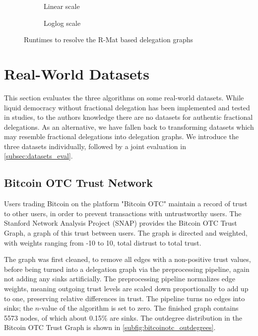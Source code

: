 \begin{figure}[t]
    \centering
    \begin{subfigure}[t]{0.45\textwidth}
        \centering
        \caption{Linear scale}
        \label{subfig:rmat_linear}
    \end{subfigure}
    \hfill
    \begin{subfigure}[t]{0.45\textwidth}
        \centering
        \caption{Loglog scale}
        \label{subfig:rmat_loglog}
    \end{subfigure}
    \caption{Runtimes to resolve the R-Mat based delegation graphs}
    \label{fig:rmat}
\end{figure}


\section{Real-World Datasets}

This section evaluates the three algorithms on some real-world datasets. While liquid democracy without fractional delegation has been implemented and tested in studies, to the authors knowledge there are no datasets for authentic fractional delegations. As an alternative, we have fallen back to transforming datasets which may resemble fractional delegations into delegation graphs. We  introduce the three datasets individually, followed by a joint evaluation in \cref{subsec:datasets_eval}.

\subsection{Bitcoin OTC Trust Network}

Users trading Bitcoin on the platform "Bitcoin OTC" maintain a record of trust to other users, in order to prevent transactions with untrustworthy users. The Stanford Network Analysis Project (SNAP) provides the Bitcoin OTC Trust Graph, a graph of this trust between users. \cite{kumar2016edge, kumar2018rev2} The graph is directed and weighted, with weights ranging from -10 to 10, total distrust to total trust. 

The graph was first cleaned, to remove all edges with a non-positive trust values, before being turned into a delegation graph via the preprocessing pipeline, again not adding any sinks artificially. The preprocessing pipeline normalizes edge weights, meaning outgoing trust levels are scaled down proportionally to add up to one, preserving relative differences in trust. The pipeline turns no edges into sinks; the $n$-value of the algorithm is set to zero. The finished graph contains 5573 nodes, of which about 0.15\% are sinks. The outdegree distribution in the Bitcoin OTC Trust Graph is shown in \cref{subfig:bitcoinotc_outdegrees}.

